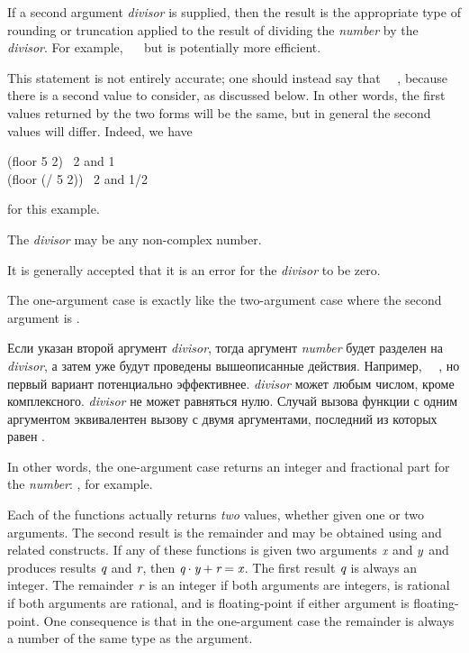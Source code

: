\begin{defun}[Function]
If a second argument \emph{divisor} is supplied, then the result
is the appropriate type of rounding or truncation applied to the
result of dividing the \emph{number} by the \emph{divisor}.
For example, ~\EQ~ but is potentially more
efficient.
\begin{new}%
This statement is not entirely accurate; one should instead say that
~\EQ~,
because there is a second value to consider, as discussed below.
In other words, the first values returned by the two forms will be the same, but
in general the second values will differ.  Indeed, we have
\begin{lisp}
(floor 5 2) \EV\ 2 \textrm{and} 1 \\
(floor (/ 5 2)) \EV\ 2 \textrm{and} 1/2
\end{lisp}
for this example.
\end{new}
The \emph{divisor} may be any non-complex number.
\begin{new}%
It is generally accepted that it is an error for the \emph{divisor} to be zero.
\end{new}
The one-argument case is exactly like the two-argument case where the second
argument is .

Если указан второй аргумент \emph{divisor}, тогда аргумент \emph{number} будет
разделен на \emph{divisor}, а затем уже будут проведены вышеописанные действия.
Например, ~\EQ~, но первый вариант
потенциально эффективнее.
\emph{divisor} может любым числом, кроме комплексного.
\emph{divisor} не может равняться нулю.
Случай вызова функции с одним аргументом эквивалентен вызову с двумя
аргументами, последний из которых равен .

\begin{newer}
In other words, the one-argument case returns an integer and fractional part
for the \emph{number}: , for example.
\end{newer}
Each of the functions actually returns \emph{two} values,
whether given one or two arguments.  The second
result is the remainder and may be obtained using
 and related constructs.
If any of these functions is given two arguments $\emph{x}$ and $\emph{y}$
and produces results $\emph{q}$ and $\emph{r}$, then $\emph{q} \cdot \emph{y}+\emph{r}=\emph{x}$.
The first result $\emph{q}$ is always an integer.
The remainder $\emph{r}$ is an integer if both arguments are integers,
is rational if both arguments are rational,
and is floating-point if either argument is floating-point.
One consequence is that
in the one-argument case the remainder is always a number of the same type
as the argument.


\end{defun}
